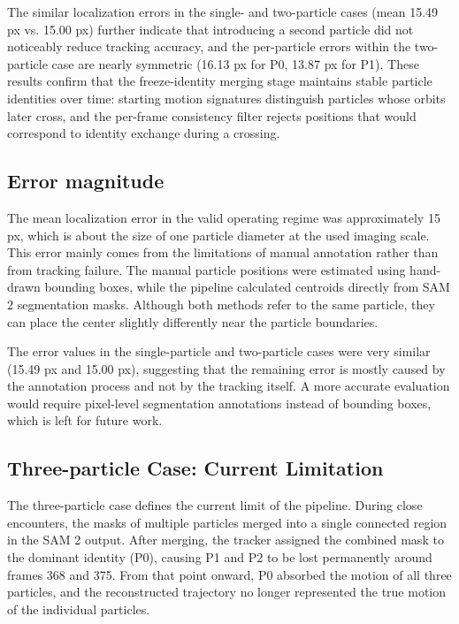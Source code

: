 \documentclass[conference]{IEEEtran}
\begin{document}
The similar localization errors in the single- and two-particle cases (mean 15.49 px vs. 15.00 px) further indicate that introducing a second particle did not noticeably reduce tracking accuracy, and the per-particle errors within the two-particle case are nearly symmetric (16.13 px for P0, 13.87 px for P1). These results confirm that the freeze-identity merging stage maintains stable particle identities over time: starting motion signatures distinguish particles whose orbits later cross, and the per-frame consistency filter rejects positions that would correspond to identity exchange during a crossing. 

\subsection{Error magnitude}

The mean localization error in the valid operating regime was approximately 15 px, which is about the size of one particle diameter at the used imaging scale. This error mainly comes from the limitations of manual annotation rather than from tracking failure. The manual particle positions were estimated using hand-drawn bounding boxes, while the pipeline calculated centroids directly from SAM 2 segmentation masks. Although both methods refer to the same particle, they can place the center slightly differently near the particle boundaries.

The error values in the single-particle and two-particle cases were very similar (15.49 px and 15.00 px), suggesting that the remaining error is mostly caused by the annotation process and not by the tracking itself. A more accurate evaluation would require pixel-level segmentation annotations instead of bounding boxes, which is left for future work.

\subsection{Three-particle Case: Current Limitation}
\label{sec:limitations}

The three-particle case defines the current limit of the pipeline. During close encounters, the masks of multiple particles merged into a single connected region in the SAM 2 output. After merging, the tracker assigned the combined mask to the dominant identity (P0), causing P1 and P2 to be lost permanently around frames 368 and 375. From that point onward, P0 absorbed the motion of all three particles, and the reconstructed trajectory no longer represented the true motion of the individual particles.
\end{document}

